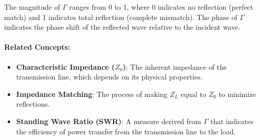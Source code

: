 The magnitude of \(\Gamma\) ranges from 0 to 1, where 0 indicates no reflection (perfect match) and 1 indicates total reflection (complete mismatch). The phase of \(\Gamma\) indicates the phase shift of the reflected wave relative to the incident wave.

\paragraph{Related Concepts:}
\begin{itemize}
    \item \textbf{Characteristic Impedance (\(Z_0\))}: The inherent impedance of the transmission line, which depends on its physical properties.
    \item \textbf{Impedance Matching}: The process of making \(Z_L\) equal to \(Z_0\) to minimize reflections.
    \item \textbf{Standing Wave Ratio (SWR)}: A measure derived from \(\Gamma\) that indicates the efficiency of power transfer from the transmission line to the load.
\end{itemize}

